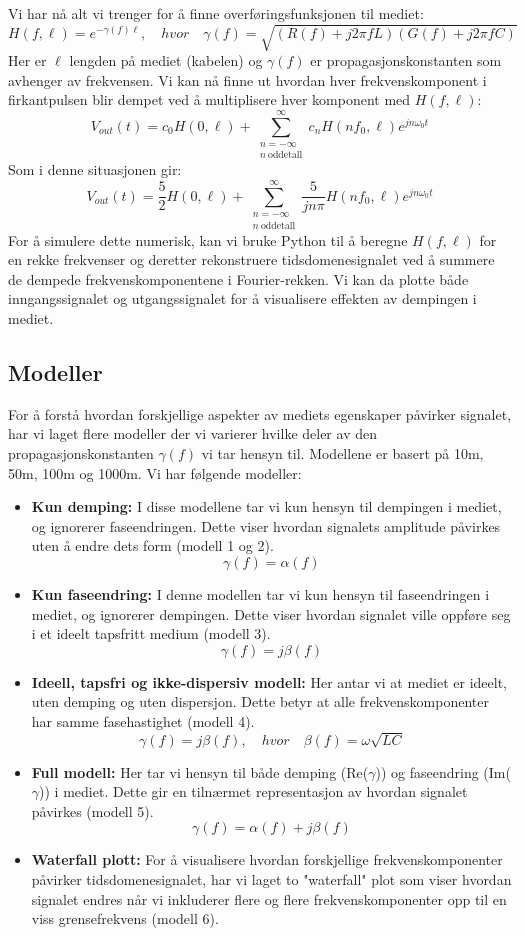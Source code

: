 \noindent Vi har nå alt vi trenger for å finne overføringsfunksjonen til mediet:
\[
    H(f, \ell) = e^{-\gamma(f) \ell}, \quad hvor \quad \gamma(f) = \sqrt{(R(f) + j 2\pi f L)(G(f) + j 2\pi f C)}
\]
Her er $\ell$ lengden på mediet (kabelen) og $\gamma(f)$ er propagasjonskonstanten som avhenger av frekvensen.
Vi kan nå finne ut hvordan hver frekvenskomponent i firkantpulsen blir dempet ved å multiplisere hver komponent med $H(f, \ell)$:
\[
    V_{out}(t) = c_0H(0, \ell) + \sum_{\substack{n=-\infty\\ n\ \text{oddetall}}}^{\infty} c_n H(n f_0, \ell) e^{j n \omega_0 t}
\]
Som i denne situasjonen gir:
\[
    V_{out}(t) = \frac{5}{2}H(0, \ell) + \sum_{\substack{n=-\infty\\ n\ \text{oddetall}}}^{\infty} \frac{5}{j n \pi} H(n f_0, \ell) e^{j n \omega_0 t}    
\]
For å simulere dette numerisk, kan vi bruke Python til å beregne $H(f, \ell)$ for en rekke frekvenser og deretter rekonstruere tidsdomenesignalet ved å summere de dempede frekvenskomponentene i Fourier-rekken.
Vi kan da plotte både inngangssignalet og utgangssignalet for å visualisere effekten av dempingen i mediet.
\clearpage
\subsection{Modeller}
For å forstå hvordan forskjellige aspekter av mediets egenskaper påvirker signalet, har vi laget flere modeller der vi varierer hvilke deler av den propagasjonskonstanten $\gamma(f)$ vi tar hensyn til. Modellene er basert på 10m, 50m, 100m og 1000m. Vi har følgende modeller:\\
\begin{itemize}
    \item \textbf{Kun demping:} I disse modellene tar vi kun hensyn til dempingen i mediet, og ignorerer faseendringen. Dette viser hvordan signalets amplitude påvirkes uten å endre dets form (modell 1 og 2).
    \[
        \gamma(f) = \alpha(f)
    \]
    \item \textbf{Kun faseendring:} I denne modellen tar vi kun hensyn til faseendringen i mediet, og ignorerer dempingen. Dette viser hvordan signalet ville oppføre seg i et ideelt tapsfritt medium (modell 3).
    \[
        \gamma(f) = j\beta(f)
    \]
    \item \textbf{Ideell, tapsfri og ikke-dispersiv modell:} Her antar vi at mediet er ideelt, uten demping og uten dispersjon. Dette betyr at alle frekvenskomponenter har samme fasehastighet (modell 4).
    \[
        \gamma(f) = j\beta(f), \quad hvor \quad \beta(f) = \omega\sqrt{LC}
    \]
    \item \textbf{Full modell:} Her tar vi hensyn til både demping (Re($\gamma$)) og faseendring (Im($\gamma$)) i mediet. Dette gir en tilnærmet representasjon av hvordan signalet påvirkes (modell 5).
    \[
        \gamma(f) = \alpha(f) + j\beta(f)
    \]
    \item \textbf{Waterfall plott:} For å visualisere hvordan forskjellige frekvenskomponenter påvirker tidsdomenesignalet, har vi laget to "waterfall" plot som viser hvordan signalet endres når vi inkluderer flere og flere frekvenskomponenter opp til en viss grensefrekvens (modell 6).
\end{itemize}
\clearpage
